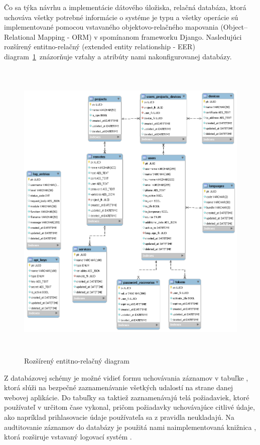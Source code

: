 Čo sa týka návrhu a implementácie dátového úložiska, relačná databáza, ktorá uchováva všetky potrebné informácie o systéme
je typu  a všetky operácie sú implementované pomocou vstavaného objektovo-relačného
mapovania (Object–Relational Mapping - ORM) v spomínanom frameworku Django.
Nasledujúci rozšírený entitno-relačný (extended entity relationship - EER) diagram~\ref{fig:obr_13}~znázorňuje
vzťahy a atribúty nami nakonfigurovanej databázy.

\begin{figure}[H]
\begin{center}\includegraphics[width=\textwidth,height=15cm,keepaspectratio=true]{assets/eer_diagram_v2}\end{center}
\caption[Rozšírený entitno-relačný diagram]{Rozšírený entitno-relačný diagram}\label{fig:obr_13}
\end{figure}

Z databázovej schémy je možné vidieť formu uchovávania záznamov v tabuľke , ktorá slúži na bezpečné
zaznamenávanie všetkých udalostí na strane danej webovej aplikácie.
Do tabuľky sa taktiež zaznamenávajú telá požiadaviek, ktoré používateľ v určitom čase vykonal, pričom požiadavky uchovávajúce
citlivé údaje, ako napríklad prihlasovacie údaje používateľa sa z pravidla neukladajú.
Na audtitovanie záznamov do databázy je použitá nami naimplementovaná knižnica , ktorá rozširuje
vstavaný logovací systém .

